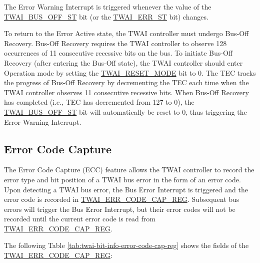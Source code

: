 \documentclass[main\_\_EN.tex]{subfiles}
\begin{document}
The Error Warning Interrupt is triggered whenever the value of the \hyperref[fielddesc:TWAIBUSOFFST]{TWAI\_BUS\_OFF\_ST} bit (or the \hyperref[fielddesc:TWAIERRST]{TWAI\_ERR\_ST} bit) changes.

To return to the Error Active state, the TWAI controller must undergo Bus-Off Recovery. Bus-Off Recovery requires the TWAI controller to observe 128 occurrences of 11 consecutive recessive bits on the bus. To initiate Bus-Off Recovery (after entering the Bus-Off state), the TWAI controller should enter Operation mode by setting the \hyperref[fielddesc:TWAIRESETMODE]{TWAI\_RESET\_MODE} bit to 0.
The TEC tracks the progress of Bus-Off Recovery by decrementing the TEC each time when the TWAI controller observes 11 consecutive recessive bits. When Bus-Off Recovery has completed (i.e., TEC has decremented from 127 to 0), the \hyperref[fielddesc:TWAIBUSOFFST]{TWAI\_BUS\_OFF\_ST} bit will automatically be reset to 0, thus triggering the Error Warning Interrupt.


\subsection{Error Code Capture}

The Error Code Capture (ECC) feature allows the TWAI controller to record the error type and bit position of a TWAI bus error in the form of an error code. Upon detecting a TWAI bus error, the Bus Error Interrupt is triggered and the error code is recorded in \hyperref[regdesc:TWAIERRCODECAPREG]{TWAI\_ERR\_CODE\_CAP\_REG}. Subsequent bus errors will trigger the Bus Error Interrupt, but their error codes will not be recorded until the current error code is read from \hyperref[regdesc:TWAIERRCODECAPREG]{TWAI\_ERR\_CODE\_CAP\_REG}.

The following Table \ref{tab:twai-bit-info-error-code-cap-reg} shows the fields of the \hyperref[regdesc:TWAIERRCODECAPREG]{TWAI\_ERR\_CODE\_CAP\_REG}:
\end{document}
